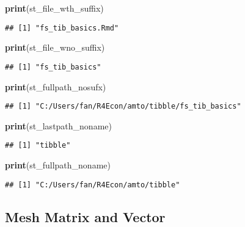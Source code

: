 \documentclass[
]{book}
\newenvironment{Shaded}{\begin{snugshade}}{\end{snugshade}}
\newcommand{\KeywordTok}[1]{\textcolor[rgb]{0.13,0.29,0.53}{\textbf{#1}}}
\newcommand{\NormalTok}[1]{#1}
\begin{document}
\begin{Shaded}
\begin{Highlighting}[]
\KeywordTok{print}\NormalTok{(st_file_wth_suffix)}
\end{Highlighting}
\end{Shaded}

\begin{verbatim}
## [1] "fs_tib_basics.Rmd"
\end{verbatim}

\begin{Shaded}
\begin{Highlighting}[]
\KeywordTok{print}\NormalTok{(st_file_wno_suffix)}
\end{Highlighting}
\end{Shaded}

\begin{verbatim}
## [1] "fs_tib_basics"
\end{verbatim}

\begin{Shaded}
\begin{Highlighting}[]
\KeywordTok{print}\NormalTok{(st_fullpath_nosufx)}
\end{Highlighting}
\end{Shaded}

\begin{verbatim}
## [1] "C:/Users/fan/R4Econ/amto/tibble/fs_tib_basics"
\end{verbatim}

\begin{Shaded}
\begin{Highlighting}[]
\KeywordTok{print}\NormalTok{(st_lastpath_noname)}
\end{Highlighting}
\end{Shaded}

\begin{verbatim}
## [1] "tibble"
\end{verbatim}

\begin{Shaded}
\begin{Highlighting}[]
\KeywordTok{print}\NormalTok{(st_fullpath_noname)}
\end{Highlighting}
\end{Shaded}

\begin{verbatim}
## [1] "C:/Users/fan/R4Econ/amto/tibble"
\end{verbatim}

\hypertarget{mesh-matrix-and-vector}{%
\subsection{Mesh Matrix and Vector}\label{mesh-matrix-and-vector}}
\end{document}
